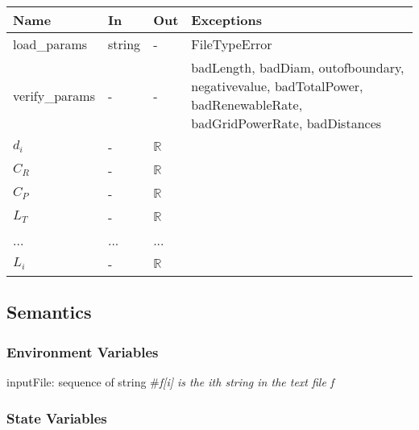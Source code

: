 \documentclass[12pt, titlepage]{article}
\begin{document}
\begin{tabular}{p{3cm} p{1cm} p{1cm} >{\raggedright\arraybackslash}p{9cm}}
\toprule
\textbf{Name} & \textbf{In} & \textbf{Out} & \textbf{Exceptions} \\
\midrule
load\_params & string & - &  FileTypeError \\
verify\_params & - & - & badLength, badDiam, outofboundary, negativevalue,
                        badTotalPower, badRenewableRate, badGridPowerRate,
                        badDistances\\
$d_i$ & - & $\mathbb{R}$\\
$C_R$ & - & $\mathbb{R}$\\
$C_P$ & - & $\mathbb{R}$\\
$L_T$ & - & $\mathbb{R}$\\
... & ... & ...\\
$L_i$ & - & $\mathbb{R}$ \\
\bottomrule
\end{tabular}

\subsection{Semantics}

\subsubsection{Environment Variables}

inputFile: sequence of string \#\textit{f[i] is the ith string in the text file f}\\ 

\subsubsection{State Variables}
\end{document}

